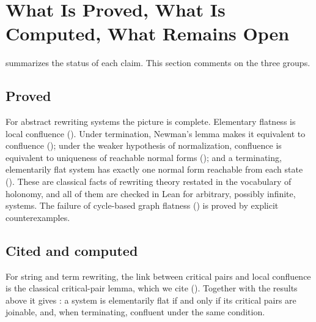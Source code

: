 \section{What Is Proved, What Is Computed, What Remains Open}
\label{sec:proved-supported-deferred}

 summarizes the status of each claim. This section comments on the three groups.

\begin{table}[t]
    \caption{Status of the main claims. ``Proved'' means proved in the paper and, where indicated, in Lean. ``Cited'' means a classical result used as stated in the literature. ``Computed'' means verified on the specific systems examined. ``Open'' means not established here.}
    \label{tab:claim-support-matrix}
    \centering
    \smallskip
    
\end{table}

\subsection{Proved}
\label{subsec:what-is-proved}

For abstract rewriting systems the picture is complete. Elementary flatness is local confluence (). Under termination, Newman's lemma makes it equivalent to confluence (); under the weaker hypothesis of normalization, confluence is equivalent to uniqueness of reachable normal forms (); and a terminating, elementarily flat system has exactly one normal form reachable from each state (). These are classical facts of rewriting theory restated in the vocabulary of holonomy, and all of them are checked in Lean for arbitrary, possibly infinite, systems. The failure of cycle-based graph flatness () is proved by explicit counterexamples.

\subsection{Cited and computed}
\label{subsec:what-is-supported}

For string and term rewriting, the link between critical pairs and local confluence is the classical critical-pair lemma, which we cite (). Together with the results above it gives : a system is elementarily flat if and only if its critical pairs are joinable, and, when terminating, confluent under the same condition.

